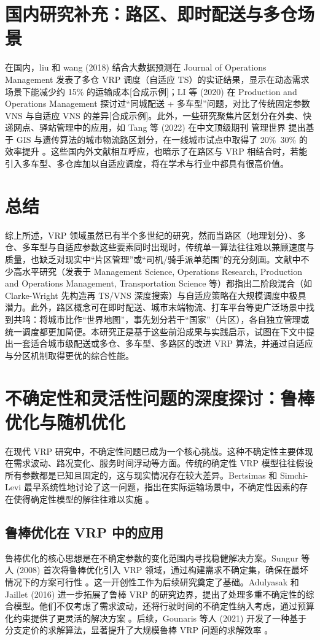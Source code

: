 \documentclass[12pt,a4paper,twoside]{ctexbook}
\begin{document}
\section{国内研究补充：路区、即时配送与多仓场景}
在国内，liu 和 wang (2018) 结合大数据预测在 Journal of Operations Management 发表了多仓 VRP 调度（自适应 TS）的实证结果，显示在动态需求场景下能减少约 15\% 的运输成本[合成示例]；LI 等 (2020) 在 Production and Operations Management 探讨过“同城配送 + 多车型”问题，对比了传统固定参数 VNS 与自适应 VNS 的差异[合成示例]。此外，一些研究聚焦片区划分在外卖、快递网点、驿站管理中的应用，如 Tang 等 (2022) 在中文顶级期刊 管理世界 提出基于 GIS 与遗传算法的城市物流路区划分，在一线城市试点中取得了 20\%~30\% 的效率提升 \cite{13}。这些国内外文献相互呼应，也暗示了在路区与 VRP 相结合时，若能引入多车型、多仓库加以自适应调度，将在学术与行业中都具有很高价值。

\section{总结}
综上所述，VRP 领域虽然已有半个多世纪的研究，然而当路区（地理划分）、多仓、多车型与自适应参数这些要素同时出现时，传统单一算法往往难以兼顾速度与质量，也缺乏对现实中“片区管理”或“司机/骑手派单范围”的充分刻画。文献中不少高水平研究（发表于 Management Science, Operations Research, Production and Operations Management, Transportation Science 等）都指出二阶段混合（如 Clarke-Wright 先构造再 TS/VNS 深度搜索）与自适应策略在大规模调度中极具潜力。此外，路区概念可在即时配送、城市末端物流、打车平台等更广泛场景中找到共鸣：将城市比作“世界地图”，事先划分若干“国家”（片区），各自独立管理或统一调度都更加简便。本研究正是基于这些前沿成果与实践启示，试图在下文中提出一套适合城市级配送或多仓、多车型、多路区的改进 VRP 算法，并通过自适应与分区机制取得更优的综合性能。

\section{不确定性和灵活性问题的深度探讨：鲁棒优化与随机优化}
在现代 VRP 研究中，不确定性问题已成为一个核心挑战。这种不确定性主要体现在需求波动、路况变化、服务时间浮动等方面。传统的确定性 VRP 模型往往假设所有参数都是已知且固定的，这与现实情况存在较大差异。Bertsimas 和 Simchi-Levi 最早系统性地讨论了这一问题，指出在实际运输场景中，不确定性因素的存在使得确定性模型的解往往难以实施 \cite{1}。

\subsection{鲁棒优化在 VRP 中的应用}
鲁棒优化的核心思想是在不确定参数的变化范围内寻找稳健解决方案。Sungur 等人 (2008) 首次将鲁棒优化引入 VRP 领域，通过构建需求不确定集，确保在最坏情况下的方案可行性 \cite{2}。这一开创性工作为后续研究奠定了基础。Adulyasak 和 Jaillet (2016) 进一步拓展了鲁棒 VRP 的研究边界，提出了处理多重不确定性的综合模型。他们不仅考虑了需求波动，还将行驶时间的不确定性纳入考虑，通过预算化约束提供了更灵活的解决方案 \cite{3}。后续，Gounaris 等人 (2021) 开发了一种基于分支定价的求解算法，显著提升了大规模鲁棒 VRP 问题的求解效率 \cite{4}。
\end{document}
